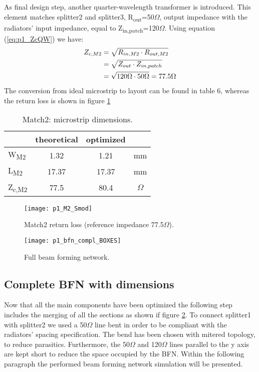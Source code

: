 As final design step, another quarter-wavelength transformer is introduced. This element matches splitter2 and splitter3, R\textsubscript{out}=50$\Omega$, output impedance with the radiators' input impedance, equal to Z\textsubscript{in,patch}=120$\Omega$. Using equation (\ref{eq:p1_ZcQW}) we have:
\begin{align}
	Z_{c,M2}&=\sqrt{R_{in,M2}\cdot R_{out,M2}} \notag\\
	&=\sqrt{Z_{out}\cdot Z_{in,patch}} \notag\\
	&=\sqrt{120\Omega \cdot 50\Omega}=77.5\Omega \notag
\end{align}
The conversion from ideal microstrip to layout can be found in table 6, whereas the return loss is shown in figure \ref{fig:p1_M2_Smod}

\begin{table} [H]
	\label{tab:21_DimM2}
	\caption{Match2: microstrip dimensions.}
	\centering	
	\begin{tabular}{lccc} 
		\toprule
		& theoretical 			& optimized &\\
		\midrule 
		W\textsubscript{M2} 	&	1.32		&	1.21	& mm 		\\
		L\textsubscript{M2}		&	17.37		& 	17.37	& mm		\\ 
		Z\textsubscript{c,M2}	&	77.5		& 	80.4	& $\Omega$		\\
		\bottomrule
	\end{tabular}	
\end{table}

\begin{figure}[t] 
	\centering
	\texttt{[image: p1\_M2\_Smod]}
	\caption{Match2 return loss (reference impedance 77.5$\Omega$). }
	\label{fig:p1_M2_Smod}
\end{figure}
\newpage
\begin{figure}[H] 
	\centering
	\texttt{[image: p1\_bfn\_compl\_BOXES]}
	\caption{Full beam forming network. }
	\label{fig:p1_bfn_compl1}
\end{figure}

\newpage

\subsection{Complete BFN with dimensions}

Now that all the main components have been optimized the following step includes the merging of all the sections as shown if figure \ref{fig:p1_bfn_compl1}.
To connect splitter1 with splitter2 we used a 50$\Omega$ line bent in order to be compliant with the radiators' spacing specification. The bend has been chosen with mitered topology, to reduce parasitics. Furthermore, the 50$\Omega$ and 120$\Omega$ lines parallel to the y axis are kept short to reduce the space occupied by the BFN. Within the following paragraph the performed beam forming network simulation will be presented.

